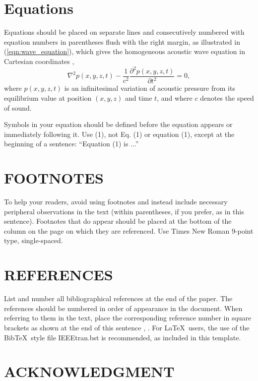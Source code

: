 \documentclass[a4paper,10pt,oneside]{article}
\begin{document}
\begin{sloppy}
\section{Equations}
\label{sec:equations}

Equations should be placed on separate lines and consecutively numbered with equation numbers in parentheses flush with the right margin, as illustrated in (\ref{eqn:wave_equation}), which gives the homogeneous acoustic wave equation in Cartesian coordinates \cite{eWilliams1999},
\begin{equation}
  \label{eqn:wave_equation}
    \nabla^2p(x,y,z,t)-
    \displaystyle\frac{1}{c^2}\frac{\partial^2p(x,y,z,t)}{\partial t^2}=0,
\end{equation}
where $p(x,y,z,t)$ is an infinitesimal variation of acoustic pressure from its equilibrium value at position $(x,y,z)$ and time $t$, and where $c$ denotes the speed of sound.

Symbols in your equation should be defined before the equation appears or immediately following it. Use (1), not Eq. (1) or equation (1), except at the beginning of a sentence: ``Equation (1) is ...''

\section{FOOTNOTES}
\label{sec:foot}

To help your readers, avoid using footnotes and instead include necessary peripheral observations in the text (within parentheses, if you prefer, as in this sentence). Footnotes that do appear should be placed at the bottom of the column on the page on which they are referenced. Use Times New Roman 9-point type, single-spaced. 

\section{REFERENCES}
\label{sec:ref}

List and number all bibliographical references at the end of the paper. The references should be numbered in order of appearance in the document. When referring to them in the text, place the corresponding reference number in square brackets as shown at the end of this sentence \cite{aBee2001}, \cite{mSmith2001}. For \LaTeX\ users, the use of the Bib\TeX\ style file IEEEtran.bst is recommended, as included in this template.

\section{ACKNOWLEDGMENT}
\label{sec:ack}


\end{sloppy}
\end{document}
